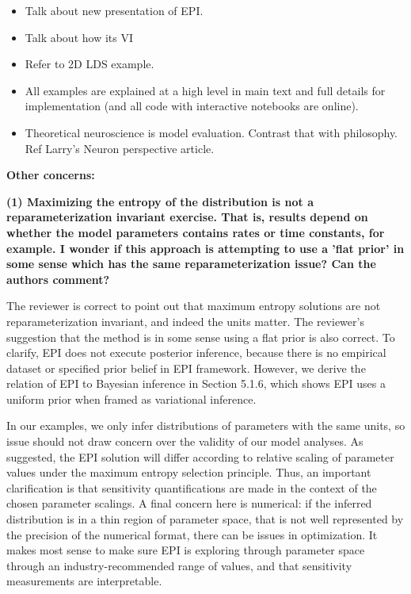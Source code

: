 \documentclass[11pt,a4paper]{article}
\begin{document}
\begin{itemize}
\item Talk about new presentation of EPI.
\item Talk about how its VI
\item Refer to 2D LDS example.
\item All examples are explained at a high level in main text and full details for implementation (and all code with interactive notebooks are online).
\item Theoretical neuroscience is model evaluation.  Contrast that with philosophy. Ref Larry's Neuron perspective article.
\end{itemize}

\textbf{Other concerns: }

\textbf{(1) Maximizing the entropy of the distribution is not a reparameterization invariant exercise. That is, results depend on whether the model parameters contains rates or time constants, for example. I wonder if this approach is attempting to use a 'flat prior' in some sense which has the same reparameterization issue? Can the authors comment? }

The reviewer is correct to point out that maximum entropy solutions are not reparameterization invariant, and indeed the units matter.  The reviewer’s suggestion that the method is in some sense using a flat prior is also correct.  To clarify, EPI does not execute posterior inference, because there is no empirical dataset or specified prior belief in EPI framework.  However, we derive the relation of EPI to Bayesian inference in Section 5.1.6, which shows EPI uses a uniform prior when framed as variational inference.
 
In our examples, we only infer distributions of parameters with the same units, so issue should not draw concern over the validity of our model analyses.  As suggested, the EPI solution will differ according to relative scaling of parameter values under the maximum entropy selection principle. Thus, an important clarification is that sensitivity quantifications are made in the context of the chosen parameter scalings. A final concern here is numerical: if the inferred distribution is in a thin region of parameter space, that is not well represented by the precision of the numerical format, there can be issues in optimization.  It makes most sense to make sure EPI is exploring through parameter space through an industry-recommended range of values, and that sensitivity measurements are interpretable.
\end{document}
